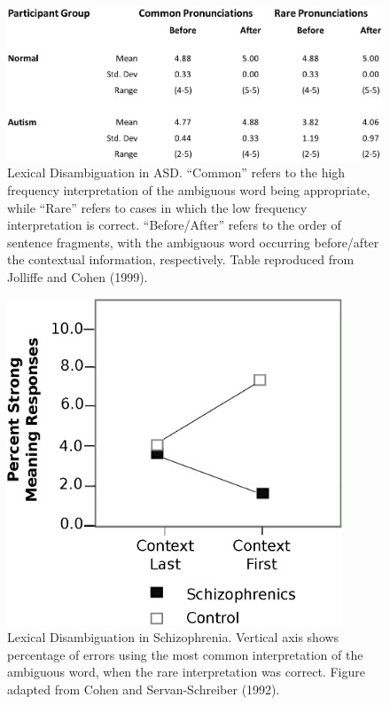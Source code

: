 \begin{figure}[tp]
\begin{center}
	\includegraphics[width=115mm]{figures/asd_lexamb_study_results.eps}
\end{center}
\caption{Lexical Disambiguation in ASD. ``Common'' refers to the high frequency interpretation of the ambiguous word being appropriate, while ``Rare'' refers to cases in which the low frequency interpretation is correct. ``Before/After'' refers to the order of sentence fragments, with the ambiguous word occurring before/after the contextual information, respectively. Table reproduced from Jolliffe and Cohen (1999).}
\label{asd-lexamb-study}
\end{figure} 

\begin{figure}[tp]
\begin{center}
	\includegraphics[width=100mm]{figures/schiz_lexamb_study_results.eps}
\end{center}
\caption{Lexical Disambiguation in Schizophrenia. Vertical axis shows percentage of errors using the most common interpretation of the ambiguous word, when the rare interpretation was correct. Figure adapted from Cohen and Servan-Schreiber (1992).}
\label{schiz-lexamb-study}
\end{figure} 


